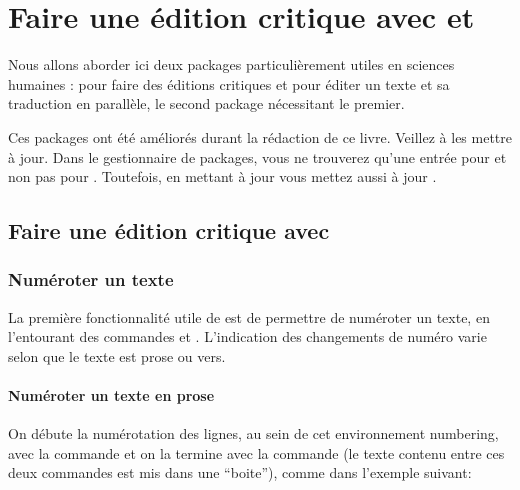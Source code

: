 \chapter{Faire une édition critique avec  et }  \label{ledmac}


\begin{prealable}
Nous allons aborder ici deux packages particulièrement utiles en sciences humaines :  pour faire des éditions critiques et  pour éditer un texte et sa traduction en parallèle, le second package nécessitant le premier.
\end{prealable}

\begin{attention}
Ces packages ont été améliorés durant la rédaction de ce livre. Veillez à les mettre à jour.
Dans le gestionnaire de packages, vous ne trouverez qu'une entrée pour   et non pas pour .  Toutefois, en mettant à jour  vous mettez aussi à jour  .
\end{attention}



\section{Faire une édition critique avec }

\subsection{Numéroter un texte}

La première fonctionnalité utile de  est  de permettre  de numéroter un texte, en l'entourant des commandes  et . L'indication des changements de numéro varie selon que le texte est prose ou vers.

\subsubsection{Numéroter un texte en prose}


On débute la numérotation des lignes, au sein de cet environnement numbering, avec la commande  et on la termine avec la commande  (le texte contenu entre ces deux commandes est mis dans une \enquote{boite}), comme dans l'exemple suivant:

